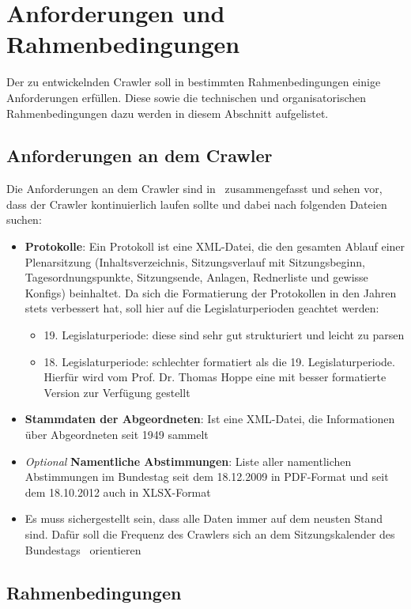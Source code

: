 \section{Anforderungen und Rahmenbedingungen}\label{sec:02_02_anforderungen_rahmen}
Der zu entwickelnden Crawler soll in bestimmten Rahmenbedingungen einige Anforderungen erfüllen. Diese sowie die technischen und organisatorischen Rahmenbedingungen dazu werden in diesem Abschnitt aufgelistet. 
\subsection{Anforderungen an dem Crawler}\label{subsec:02_02_anforderungen}
Die Anforderungen an dem Crawler sind in~\cite{Hoppe2020Uebung} zusammengefasst und sehen vor, dass der Crawler kontinuierlich laufen sollte und dabei nach folgenden Dateien suchen:
\begin{itemize}
  \item \textbf{Protokolle}: Ein Protokoll ist eine XML-Datei, die den gesamten Ablauf einer Plenarsitzung (Inhaltsverzeichnis, Sitzungsverlauf mit Sitzungsbeginn, Tagesordnungspunkte, Sitzungsende, Anlagen, Rednerliste und  gewisse Konfigs) beinhaltet. Da sich die Formatierung der Protokollen in den Jahren stets verbessert hat, soll hier auf die Legislaturperioden geachtet werden:
  \begin{itemize}
    \item 19. Legislaturperiode: diese sind sehr gut strukturiert und leicht zu parsen
    \item 18. Legislaturperiode: schlechter formatiert als die 19. Legislaturperiode. Hierfür wird vom Prof. Dr. Thomas Hoppe eine mit besser formatierte Version zur Verfügung gestellt
  \end{itemize}
  \item \textbf{Stammdaten der Abgeordneten}: Ist eine XML-Datei, die Informationen über Abgeordneten seit 1949 sammelt
  \item \textit{Optional} \textbf{Namentliche Abstimmungen}: Liste aller namentlichen Abstimmungen im Bundestag seit dem 18.12.2009 in PDF-Format und seit dem 18.10.2012 auch in XLSX-Format~\cite{NamentlicheAbstimmung20}
  \item Es muss sichergestellt sein, dass alle Daten immer auf dem neusten Stand sind. Dafür soll die Frequenz des Crawlers sich an dem Sitzungskalender des Bundestags~\cite{Sitzungskalender2021} orientieren
\end{itemize}

\subsection{Rahmenbedingungen}\label{subsec:02_02_rahmenbedingungen}
